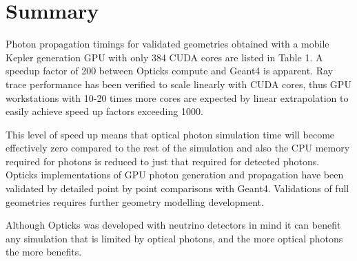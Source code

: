 \documentclass[a4paper]{jpconf}
\begin{document}
\section{Summary}

Photon propagation timings for validated geometries 
obtained with a mobile Kepler generation GPU with only 384 CUDA cores are listed in Table 1.
A speedup factor of 200 between Opticks compute and Geant4 is apparent.
Ray trace performance has been verified to scale linearly with CUDA cores, thus 
GPU workstations with 10-20 times more cores are expected by linear extrapolation 
to easily achieve speed up factors exceeding 1000.  

This level of speed up means that optical photon simulation time
will become effectively zero compared to the rest of the simulation and 
also the CPU memory required for photons is reduced to just that required for detected photons.  
Opticks implementations of GPU photon generation and propagation have been 
validated by detailed point by point comparisons with Geant4.  Validations
of full geometries requires further geometry modelling development.

Although Opticks was developed with neutrino detectors in mind 
it can benefit any simulation that is limited by optical photons, and
the more optical photons the more benefits.

\end{document}
